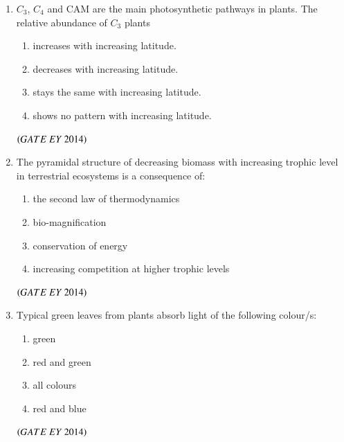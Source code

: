 \documentclass[journal]{IEEEtran}
\numberwithin{equation}{enumi}
\numberwithin{figure}{enumi}
\begin{document}
\begin{enumerate}
    \item $C_{3}$, $C_{4}$ and CAM are the main photosynthetic pathways in plants. The relative abundance of $C_{3}$ plants
    \begin{enumerate}
        \item increases with increasing latitude.
        \item decreases with increasing latitude.
        \item stays the same with increasing latitude.
        \item shows no pattern with increasing latitude.
    \end{enumerate}
    \hfill{$\brak{ GATE\ EY\ 2014}$}
    \bigskip
    
    \item The pyramidal structure of decreasing biomass with increasing trophic level in terrestrial ecosystems is a consequence of:
    \begin{multicols}{2}
    \begin{enumerate}
        \item the second law of thermodynamics
        \item bio-magnification\newline
        \item conservation of energy
        \item increasing competition at higher trophic levels
    \end{enumerate}
    \end{multicols}
    \hfill{$\brak{ GATE\ EY\ 2014}$}
    \bigskip
    
    \item Typical green leaves from plants absorb light of the following colour/s:
    \begin{multicols}{2}
    \begin{enumerate}
        \item green
        \item red and green
        \item all colours
        \item red and blue
    \end{enumerate}
    \end{multicols}
    \hfill{$\brak{ GATE\ EY\ 2014}$}
    \bigskip
    

\end{enumerate}
\end{document}
